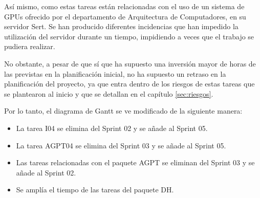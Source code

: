 Así mismo, como estas tareas están relacionadas con el uso de un sistema de GPUs
ofrecido por el departamento de Arquitectura de Computadores, en su servidor Sert.
Se han producido diferentes incidencias que han impedido la utilización del servidor durante
un tiempo, impidiendo a veces que el trabajo se pudiera realizar.

No obstante, a pesar de que sí que ha supuesto una inversión mayor de horas de las
previstas en la planificación inicial, no ha supuesto un retraso en la planificación
del proyecto, ya que entra dentro de los riesgos de estas tareas que se plantearon
al inicio y que se detallan en el capítulo \ref{sec:riesgos}.

Por lo tanto, el diagrama de Gantt se ve modificado de la siguiente manera:

\begin{itemize}
    \item La tarea I04 se elimina del Sprint 02 y se añade al Sprint 05.
    \item La tarea AGPT04 se elimina del Sprint 03 y se añade al Sprint 05.
    \item Las tareas relacionadas con el paquete AGPT se eliminan del Sprint 03 y se añade al Sprint 02.
    \item Se amplía el tiempo de las tareas del paquete DH.
\end{itemize}